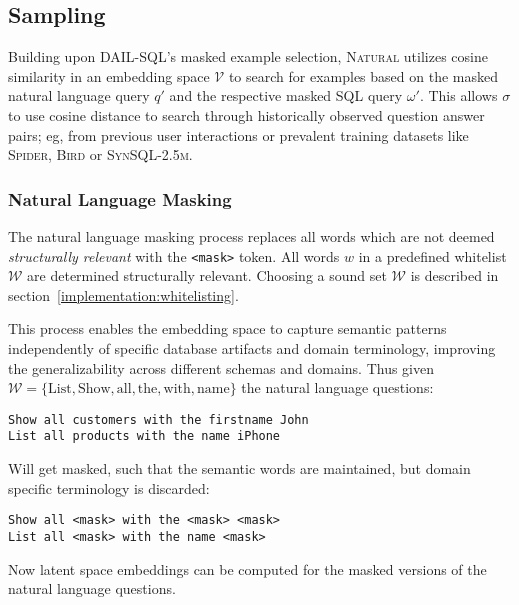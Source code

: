 \subsection{Sampling}\label{design:sampling}

Building upon DAIL-SQL's masked example selection, \textsc{Natural} utilizes 
cosine similarity in an embedding space $\mathcal{V}$ to search for examples based on the %
masked natural language query $q'$ and the respective masked SQL query $\omega'$.
This allows $\sigma$ to use cosine distance to search through historically observed
question answer pairs; eg, from previous user interactions or prevalent training
datasets like \textsc{Spider}, \textsc{Bird} or \textsc{SynSQL-2.5m}.

\subsubsection{Natural Language Masking}

The natural language masking process replaces all words which are not deemed
\textit{structurally relevant} with the \texttt{<mask>} token. All words $w$
in a predefined whitelist $\mathcal{W}$ are determined structurally relevant. %
Choosing a sound set $\mathcal{W}$ is described in section~\ref{implementation:whitelisting}.

This process enables the embedding space to capture semantic patterns independently
of specific database artifacts and domain terminology, improving the generalizability
across different schemas and domains. Thus given $\mathcal{W} = \{\text{List},
\text{Show}, \text{all}, \text{the}, \text{with}, \text{name}\}$ the natural language
questions:

\begin{verbatim}
Show all customers with the firstname John
List all products with the name iPhone
\end{verbatim}

Will get masked, such that the semantic words are maintained, but domain specific
terminology is discarded:

\begin{verbatim}
Show all <mask> with the <mask> <mask>
List all <mask> with the name <mask>
\end{verbatim}

Now latent space embeddings can be computed for the masked versions of the natural
language questions.

